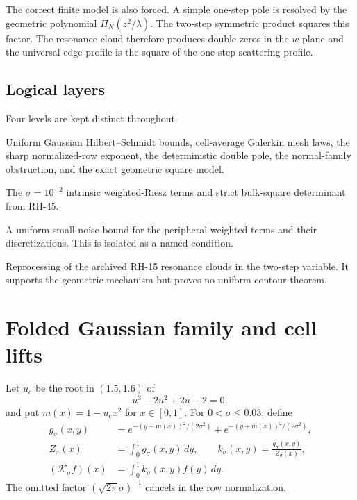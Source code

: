 \documentclass[11pt]{article}
\theoremstyle{definition}
\theoremstyle{remark}
\newcommand{\cK}{\mathcal K}
\newcommand{\uc}{u_{\mathrm c}}
\begin{document}
The correct finite model is also forced.  A simple one-step pole is resolved
by the geometric polynomial $\Pi_N(z^2/\lambda)$.  The two-step symmetric
product squares this factor.  The resonance cloud therefore produces double
zeros in the $w$-plane and the universal edge profile is the square of the
one-step scattering profile.

\subsection*{Logical layers}

Four levels are kept distinct throughout.
\begin{description}[leftmargin=3.4cm,style=nextline]
 \item[Unconditional analytic theorem]
 Uniform Gaussian Hilbert--Schmidt bounds, cell-average Galerkin mesh laws,
 the sharp normalized-row exponent, the deterministic double pole, the
 normal-family obstruction, and the exact geometric square model.
 \item[Fixed-noise validated input]
 The $\sigma=10^{-2}$ intrinsic weighted-Riesz terms and strict bulk-square
 determinant from RH-45.
 \item[Conditional bulk route]
 A uniform small-noise bound for the peripheral weighted terms and their
 discretizations.  This is isolated as a named condition.
 \item[Floating diagnostic]
 Reprocessing of the archived RH-15 resonance clouds in the two-step
 variable.  It supports the geometric mechanism but proves no uniform
 contour theorem.
\end{description}

\section{Folded Gaussian family and cell lifts}
\label{sec:operator}

Let $\uc$ be the root in $(1.5,1.6)$ of
\begin{equation}
 u^3-2u^2+2u-2=0,
 \label{eq:critical-polynomial}
\end{equation}
and put $m(x)=1-\uc x^2$ for $x\in[0,1]$.  For $0<\sigma\le0.03$, define
\begin{align}
 g_\sigma(x,y)
 &=e^{-(y-m(x))^2/(2\sigma^2)}
  +e^{-(y+m(x))^2/(2\sigma^2)},
 \label{eq:raw-kernel}\\
 Z_\sigma(x)&=\int_0^1g_\sigma(x,y)\,dy,
 \qquad
 k_\sigma(x,y)=\frac{g_\sigma(x,y)}{Z_\sigma(x)},
 \label{eq:normalized-kernel}\\
 (\cK_\sigma f)(x)&=\int_0^1k_\sigma(x,y)f(y)\,dy.
 \label{eq:operator}
\end{align}
The omitted factor $(\sqrt{2\pi}\sigma)^{-1}$ cancels in the row
normalization.
\end{document}
